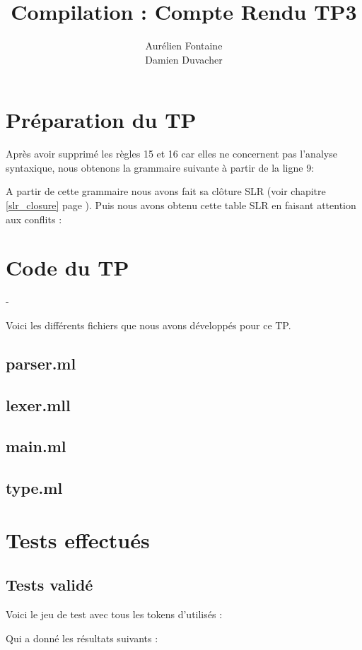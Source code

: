 \documentclass{rapport}
\author{Aurélien Fontaine\\Damien Duvacher}
\title{Compilation : Compte Rendu TP3}
\begin{document}
    \maketitle

    \chapter{Préparation du TP}
    Après avoir supprimé les règles 15 et 16 car elles ne concernent pas
    l'analyse syntaxique, nous obtenons la grammaire suivante à partir de
    la ligne 9:

    

    A partir de cette grammaire nous avons fait sa clôture SLR
    (voir chapitre \ref{slr_closure} page \pageref{slr_closure}).
    Puis nous avons obtenu cette table SLR en faisant attention aux conflits :
    

    \chapter{Code du TP}-

    Voici les différents fichiers que nous avons développés pour ce TP.

    \section{parser.ml}
    

    \section{lexer.mll}
    

    \section{main.ml}
    

    \section{type.ml}
    

    \chapter{Tests effectués}

    \section{Tests validé}
    \begin{multicols}{2}
    Voici le jeu de test avec tous les tokens d'utilisés :
    
    \vspace{5pt}
    \setlength{\columnseprule}{0.5pt}
    Qui a donné les résultats suivants :
    
    \end{multicols}
\end{document}
